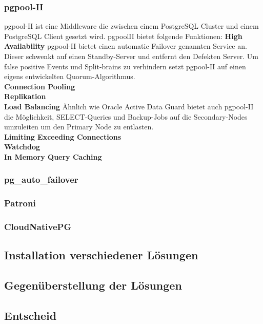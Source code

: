 \subsubsection{pgpool-II}
pgpool-II ist eine Middleware die zwischen einem \Gls{PostgreSQL Cluster} und einem PostgreSQL Client gesetzt wird.
pgpoolII bietet folgende Funktionen\cite{EXVNLICT,3XWCD3KX}:
\textbf{High Availability}
pgpool-II bietet einen automatic \Gls{Failover} genannten Service an.
Dieser schwenkt auf einen Standby-Server und entfernt den Defekten Server.
Um false positive Events und Split-brains zu verhindern setzt pgpool-II auf einen eigens entwickelten \Gls{Quorum}-Algorithmus.
\\\textbf{Connection Pooling}
\\\textbf{Replikation}
\\\textbf{Load Balancing}
Ähnlich wie Oracle Active Data Guard \cite{6294443C} bietet auch pgpool-II die Möglichkeit, SELECT-Queries und Backup-Jobs auf die Secondary-Nodes umzuleiten um den Primary Node zu entlasten.
\\\textbf{Limiting Exceeding Connections}
\\\textbf{Watchdog}
\\\textbf{In Memory Query Caching}

\subsubsection{pg\_auto\_failover}
\subsubsection{Patroni}
\subsubsection{CloudNativePG}
\subsection{Installation verschiedener Lösungen}
\subsection{Gegenüberstellung der Lösungen}
\subsection{Entscheid}